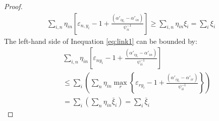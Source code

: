 \begin{proof}
\begin{eqnarray}
\sum\limits_{i,n} {{\eta _{in}}\left[ { {\varepsilon _{n,{y_i}}} -1+ \frac{{\left( {{{\alpha '}_{i{y_i}}} - {{\alpha '}_{in}}} \right)}}{{\psi_{ii}^{ - 1}}}} \right]}  
 \ge \sum\limits_{i,n} {{\eta _{in}}{\xi _i}}  = \sum\limits_i {{\xi _i}} 
\end{eqnarray}
The left-hand side of Inequation \eqref{eq:link1} can be bounded by:
\begin{eqnarray}
&&\sum\limits_{i,n} {{\eta _{in}}\left[ { {\varepsilon _{n{y_i}}}-1 + \frac{{\left( {{{\alpha '}_{i{y_i}}} - {{\alpha '}_{in}}} \right)}}{{\psi_{ii}^{ - 1}}}} \right]} \nonumber\\ &&\le \sum\limits_i {\left( {\sum\limits_n {{\eta _{in}}\mathop {\max }\limits_r \left\{ { {\varepsilon _{r{y_i}}} -1 + \frac{{\left( {{{\alpha '}_{i{y_i}}} - {{\alpha '}_{ir}}} \right)}}{{\psi_{ii}^{ - 1}}}} \right\}} } \right)}  \nonumber\\
&&= \sum\limits_i {\left( {\sum\limits_n {{\eta _{in}}{{\bar \xi }_i}} } \right)}  = \sum\limits_i {\bar \xi_i }
\end{eqnarray}
\end{proof}